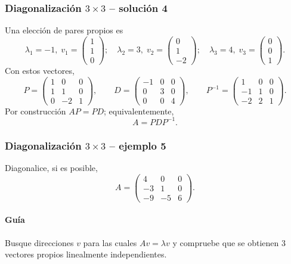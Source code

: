 \subsubsection*{Diagonalización $3\times 3$ -- solución 4}
\scriptsize
Una elección de pares propios es
\[
\lambda_1=-1,\;v_1=\begin{pmatrix}1\\1\\0\end{pmatrix};\quad \lambda_2=3,\;v_2=\begin{pmatrix}0\\1\\-2\end{pmatrix};\quad \lambda_3=4,\;v_3=\begin{pmatrix}0\\0\\1\end{pmatrix}.
\]
Con estos vectores,
\[
P=\begin{pmatrix}1 & 0 & 0\\1 & 1 & 0\\0 & -2 & 1\end{pmatrix},\qquad D=\begin{pmatrix}-1 & 0 & 0\\0 & 3 & 0\\0 & 0 & 4\end{pmatrix},\qquad P^{-1}=\begin{pmatrix}1 & 0 & 0\\-1 & 1 & 0\\-2 & 2 & 1\end{pmatrix}.
\]
Por construcción $AP=PD$; equivalentemente,
\[
\boxed{A=PDP^{-1}}.
\]


\subsubsection*{Diagonalización $3\times 3$ -- ejemplo 5}

Diagonalice, si es posible,
\[
A=\begin{pmatrix}4 & 0 & 0\\-3 & 1 & 0\\-9 & -5 & 6\end{pmatrix}.
\]

\paragraph{Guía}
Busque direcciones $v$ para las cuales $Av=\lambda v$ y compruebe que se obtienen $3$ vectores propios linealmente independientes.



